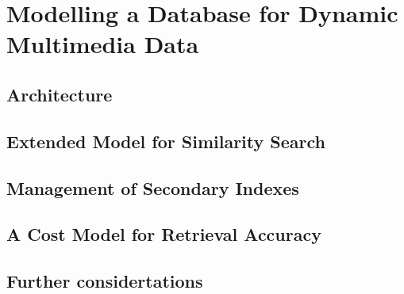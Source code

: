 \chapter{Modelling a Database for Dynamic Multimedia Data}
\section{Architecture}

\section{Extended Model for Similarity Search}

\section{Management of Secondary Indexes}

\section{A Cost Model for Retrieval Accuracy}

\section{Further considertations}
